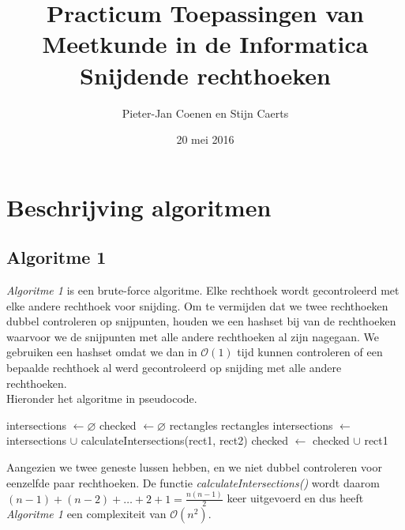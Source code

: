 \documentclass[11pt,a4paper,titlepage]{article}
\author{Pieter-Jan Coenen en Stijn Caerts}
\title{Practicum Toepassingen van Meetkunde in de Informatica \\ Snijdende rechthoeken}
\date{20 mei 2016}
\begin{document}
	\maketitle
	\tableofcontents
	\newpage
	\section{Beschrijving algoritmen}
	\subsection{Algoritme 1}
	\emph{Algoritme 1} is een brute-force algoritme. Elke rechthoek wordt gecontroleerd met elke andere rechthoek voor snijding. Om te vermijden dat we twee rechthoeken dubbel controleren op snijpunten, houden we een hashset bij van de rechthoeken waarvoor we de snijpunten met alle andere rechthoeken al zijn nagegaan. We gebruiken een hashset omdat we dan in  $\mathcal{O}(1)$ tijd kunnen controleren of een bepaalde rechthoek al werd gecontroleerd op snijding met alle andere rechthoeken.\\ Hieronder het algoritme in pseudocode.
	\begin{algorithm}[H]
		\caption{}
		\begin{algorithmic}[1]
			\State intersections $\gets \varnothing $
			\State checked $\gets \varnothing $
			 {rectangles}
				 {rectangles}
						\State intersections $ \gets $ intersections $ \cup $ calculateIntersections(rect1, rect2)
					\EndIf
				\EndForEach
				\State checked $\gets$ checked $\cup$ rect1
			\EndForEach
		\end{algorithmic}
	\end{algorithm}
	Aangezien we twee geneste lussen hebben, en we niet dubbel controleren voor eenzelfde paar rechthoeken. De functie \emph{calculateIntersections()} wordt daarom $ (n-1) + (n-2) + \dots + 2 + 1 = \frac{n(n-1)}{2} $ keer uitgevoerd en dus heeft \emph{Algoritme 1} een complexiteit van $\mathcal{O}(n^2)$.
	
\end{document}
